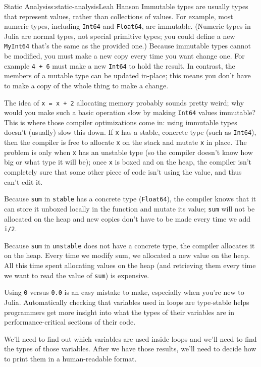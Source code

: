 \begin{aosachapter}{Static Analysis}{s:static-analysis}{Leah Hanson}
Immutable types are usually types that represent values, rather than
collections of values. For example, most numeric types, including
\texttt{Int64} and \texttt{Float64}, are immutable. (Numeric types in
Julia are normal types, not special primitive types; you could define a
new \texttt{MyInt64} that's the same as the provided one.) Because
immutable types cannot be modified, you must make a new copy every time
you want change one. For example \texttt{4 + 6} must make a new
\texttt{Int64} to hold the result. In contrast, the members of a mutable
type can be updated in-place; this means you don't have to make a copy
of the whole thing to make a change.

The idea of \texttt{x = x + 2} allocating memory probably sounds pretty
weird; why would you make such a basic operation slow by making
\texttt{Int64} values immutable? This is where those compiler
optimizations come in: using immutable types doesn't (usually) slow this
down. If \texttt{x} has a stable, concrete type (such as
\texttt{Int64}), then the compiler is free to allocate \texttt{x} on the
stack and mutate \texttt{x} in place. The problem is only when
\texttt{x} has an unstable type (so the compiler doesn't know how big or
what type it will be); once \texttt{x} is boxed and on the heap, the
compiler isn't completely sure that some other piece of code isn't using
the value, and thus can't edit it.

Because \texttt{sum} in \texttt{stable} has a concrete type
(\texttt{Float64}), the compiler knows that it can store it unboxed
locally in the function and mutate its value; \texttt{sum} will not be
allocated on the heap and new copies don't have to be made every time we
add \texttt{i/2}.

Because \texttt{sum} in \texttt{unstable} does not have a concrete type,
the compiler allocates it on the heap. Every time we modify sum, we
allocated a new value on the heap. All this time spent allocating values
on the heap (and retrieving them every time we want to read the value of
\texttt{sum}) is expensive.

Using \texttt{0} versus \texttt{0.0} is an easy mistake to make,
especially when you're new to Julia. Automatically checking that
variables used in loops are type-stable helps programmers get more
insight into what the types of their variables are in
performance-critical sections of their code.

\label{implementation-details}

We'll need to find out which variables are used inside loops and we'll
need to find the types of those variables. After we have those results,
we'll need to decide how to print them in a human-readable format.


\end{aosachapter}
